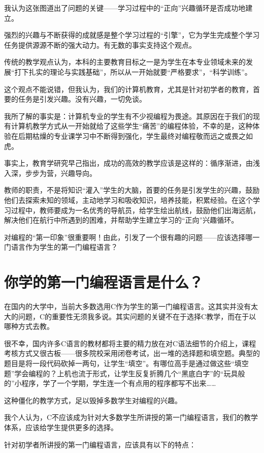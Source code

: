 我认为这张图道出了问题的关键——学习过程中的“正向”兴趣循环是否成功地建立。

强烈的兴趣与不断获得的成就感是整个学习过程的“引擎”，它为学生完成整个学习任务提供源源不断的强大动力。有无数的事实支持这个观点。

传统的教学观点认为，本科的主要教育目标之一是为学生在本专业领域未来的发展“打下扎实的理论与实践基础”，所以从一开始就要“严格要求”，“科学训练”。

这个观点不能说错，但我认为，我们的计算机教育，尤其是针对初学者的教育，首要的任务是引发兴趣。没有兴趣，一切免谈。

我所了解的事实是：计算机专业的学生有不少视编程为畏途。其原因在于我们的现有计算机教学方式从一开始就给了这些学生“痛苦”的编程体验，不幸的是，这种体验在后期枯燥的专业课学习中不断得到强化，学生最终对编程敬而远之或畏之如虎。

事实上，教育学研究早己指出，成功的高效的教学应该是这样的：循序渐进，由浅入深，步步为营，兴趣导向。

教师的职责，不是将知识“灌入”学生的大脑，首要的任务是引发学生的兴趣，鼓励他们去探索未知的领域，主动地学习和吸收知识，培养技能，积累经验。在这个学习过程中，教师要成为一名优秀的导航员，给学生绘出航线，鼓励他们出海远航，解决他们在航行中所遇到的困难，并帮助学生建立学习的“正向”兴趣循环。

对编程的“第一印象”很重要啊！由此，引发了一个很有趣的问题——应该选择哪一门语言作为学生的第一门编程语言？

\section{你学的第一门编程语言是什么？}


在国内的大学中，当前大多数选用C作为学生的第一门编程语言。这其实并没有太大的问题，C的重要性无须我多说。其实问题的关键不在于选择C教学，而在于以哪种方式去教。

很不幸，国内许多C语言的教材都将主要的精力放在对C语法细节的介绍上，课程考核方式又很古板——很多院校采用闭卷考试，出一堆的选择题和填空题。典型的题目是将一段代码砍掉一两句，让学生“填空”。有哪位高手是通过做这些“填空题”学会编程的？上机也流于形式，让学生反复折腾几个“黑底白字”的“玩具般的”小程序，学了一个学期，学生连一个有点用的程序都写不出来……

这种僵化的教学方式，足以毁掉多数学生对编程的兴趣。

 我个人认为，C不应该成为针对大多数学生所讲授的第一门编程语言，我们的教学体系，应该给学生提供更多的选择。

针对初学者所讲授的第一门编程语言，应该具有以下的特点：

